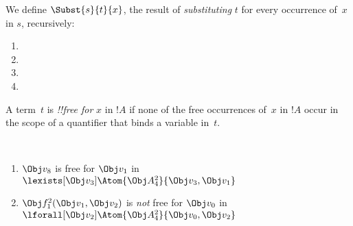 \documentclass[../../../include/open-logic-section]{subfiles}
\begin{document}


\begin{defn}
We define $\Subst{s}{t}{x}$, the result of \emph{substituting} $t$
for every occurrence of~$x$ in $s$, recursively:
\begin{enumerate}
\item {}

\item {}

\item {}

\item{}
\end{enumerate}
\end{defn}

\begin{defn}
A term~$t$ is \emph{!!{free for}} $x$ in $!A$ if none of the free
occurrences of~$x$ in $!A$ occur in the scope of a quantifier that
binds a variable in~$t$.
\end{defn}

\begin{ex} ~
\begin{enumerate}
\item $\Obj v_8$ is free for $\Obj v_1$ in $\lexists[\Obj
  v_3]\Atom{\Obj A^2_4}{\Obj v_3,\Obj v_1}$

\item $\Obj f^2_1(\Obj v_1, \Obj v_2)$ is \emph{not} free for $\Obj
  v_0$ in $\lforall[\Obj v_2]\Atom{\Obj A^2_4}{\Obj v_0,\Obj v_2}$
\end{enumerate}
\end{ex}
\end{document}
